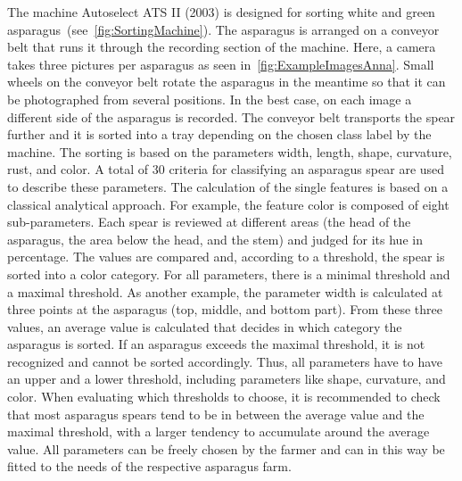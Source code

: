 The machine Autoselect ATS II (2003) is designed for sorting white and green asparagus~\citep{autoselectanleitung}(see~\autoref{fig:SortingMachine}). The asparagus is arranged on a conveyor belt that runs it through the recording section of the machine. Here, a camera takes three pictures per asparagus as seen in~\autoref{fig:ExampleImagesAnna}. Small wheels on the conveyor belt rotate the asparagus in the meantime so that it can be photographed from several positions. In the best case, on each image a different side of the asparagus is recorded. The conveyor belt transports the spear further and it is sorted into a tray depending on the chosen class label by the machine. The sorting is based on the parameters width, length, shape, curvature, rust, and color. A total of 30 criteria for classifying an asparagus spear are used to describe these parameters. The calculation of the single features is based on a classical analytical approach. For example, the feature color is composed of eight sub-parameters. Each spear is reviewed at different areas (the head of the asparagus, the area below the head, and the stem) and judged for its hue in percentage. The values are compared and, according to a threshold, the spear is sorted into a color category. For all parameters, there is a minimal threshold and a maximal threshold. As another example, the parameter width is calculated at three points at the asparagus (top, middle, and bottom part). From these three values, an average value is calculated that decides in which category the asparagus is sorted. If an asparagus exceeds the maximal threshold, it is not recognized and cannot be sorted accordingly. Thus, all parameters have to have an upper and a lower threshold, including parameters like shape, curvature, and color. When evaluating which thresholds to choose, it is recommended to check that most asparagus spears tend to be in between the average value and the maximal threshold, with a larger tendency to accumulate around the average value. All parameters can be freely chosen by the farmer and can in this way be fitted to the needs of the respective asparagus farm.

